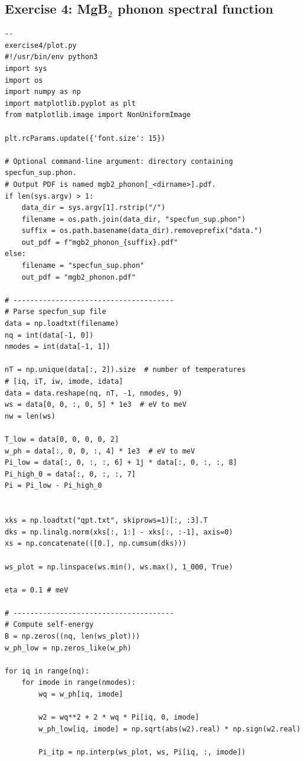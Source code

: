 \documentclass[a4paper,11pt,serif]{article}
\begin{document}
\subsection*{Exercise 4: MgB$_2$ phonon spectral function}
\begin{scriptsize}
 \begin{Verbatim}[frame=single]
--                                                                       exercise4/plot.py
#!/usr/bin/env python3
import sys
import os
import numpy as np
import matplotlib.pyplot as plt
from matplotlib.image import NonUniformImage

plt.rcParams.update({'font.size': 15})

# Optional command-line argument: directory containing specfun_sup.phon.
# Output PDF is named mgb2_phonon[_<dirname>].pdf.
if len(sys.argv) > 1:
    data_dir = sys.argv[1].rstrip("/")
    filename = os.path.join(data_dir, "specfun_sup.phon")
    suffix = os.path.basename(data_dir).removeprefix("data.")
    out_pdf = f"mgb2_phonon_{suffix}.pdf"
else:
    filename = "specfun_sup.phon"
    out_pdf = "mgb2_phonon.pdf"

# --------------------------------------
# Parse specfun_sup file
data = np.loadtxt(filename)
nq = int(data[-1, 0])
nmodes = int(data[-1, 1])

nT = np.unique(data[:, 2]).size  # number of temperatures
# [iq, iT, iw, imode, idata]
data = data.reshape(nq, nT, -1, nmodes, 9)
ws = data[0, 0, :, 0, 5] * 1e3  # eV to meV
nw = len(ws)

T_low = data[0, 0, 0, 0, 2]
w_ph = data[:, 0, 0, :, 4] * 1e3  # eV to meV
Pi_low = data[:, 0, :, :, 6] + 1j * data[:, 0, :, :, 8]
Pi_high_0 = data[:, 0, :, :, 7]
Pi = Pi_low - Pi_high_0


xks = np.loadtxt("qpt.txt", skiprows=1)[:, :3].T
dks = np.linalg.norm(xks[:, 1:] - xks[:, :-1], axis=0)
xs = np.concatenate(([0.], np.cumsum(dks)))

ws_plot = np.linspace(ws.min(), ws.max(), 1_000, True)

eta = 0.1 # meV

# --------------------------------------
# Compute self-energy
B = np.zeros((nq, len(ws_plot)))
w_ph_low = np.zeros_like(w_ph)

for iq in range(nq):
    for imode in range(nmodes):
        wq = w_ph[iq, imode]

        w2 = wq**2 + 2 * wq * Pi[iq, 0, imode]
        w_ph_low[iq, imode] = np.sqrt(abs(w2).real) * np.sign(w2.real)

        Pi_itp = np.interp(ws_plot, ws, Pi[iq, :, imode])


\end{Verbatim}
\end{scriptsize}
\end{document}
